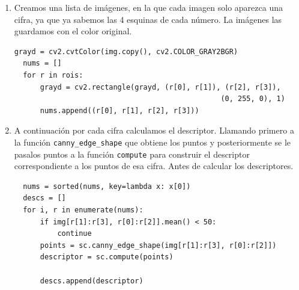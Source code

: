 \documentclass[size=a4, parskip=half, titlepage=false, toc=flat, toc=bib, 12pt]{scrartcl}
\begin{document}
\begin{enumerate}
\item Creamos una lista de imágenes, en la que cada imagen solo aparezca una cifra, ya que ya sabemos las 4 esquinas de cada número. La imágenes las guardamos con el color original.

\begin{verbatim}
grayd = cv2.cvtColor(img.copy(), cv2.COLOR_GRAY2BGR)
  nums = []
  for r in rois:
      grayd = cv2.rectangle(grayd, (r[0], r[1]), (r[2], r[3]),
                                                (0, 255, 0), 1)
      nums.append((r[0], r[1], r[2], r[3]))
\end{verbatim}

\item A continuación por cada cifra calculamos el descriptor. Llamando primero a la función \verb|canny_edge_shape| que obtiene los puntos y posteriormente se le pasalos puntos a la función \verb|compute| para construir el descriptor correspondiente a los puntos de esa cifra. Antes de calcular los descriptores.

\begin{verbatim}
  nums = sorted(nums, key=lambda x: x[0])
  descs = []
  for i, r in enumerate(nums):
      if img[r[1]:r[3], r[0]:r[2]].mean() < 50:
          continue
      points = sc.canny_edge_shape(img[r[1]:r[3], r[0]:r[2]])
      descriptor = sc.compute(points)

      descs.append(descriptor)
\end{verbatim}

\end{enumerate}

\end{document}
